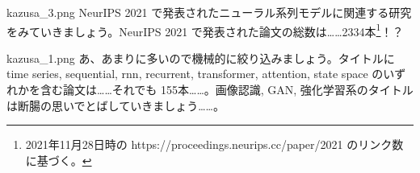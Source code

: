 \documentclass[b5paper,xelatex,ja=standard,10pt]{bxjsarticle}
\begin{document}
\begin{SERIFU}[colback=PaleIris, colbacktitle=PaleIris2]{kazusa_3.png}
NeurIPS 2021 で発表されたニューラル系列モデルに関連する研究をみていきましょう。NeurIPS 2021 で発表された論文の総数は……2334本\footnote{2021年11月28日時の https://proceedings.neurips.cc/paper/2021 のリンク数に基づく。}！？
\end{SERIFU}

\begin{SERIFU}[colback=PaleIris, colbacktitle=PaleIris2]{kazusa_1.png}
あ、あまりに多いので機械的に絞り込みましょう。タイトルに time series, sequential, rnn, recurrent, transformer, attention, state space のいずれかを含む論文は……それでも 155本……。画像認識, GAN, 強化学習系のタイトルは断腸の思いでとばしていきましょう……。
\end{SERIFU}
\end{document}
